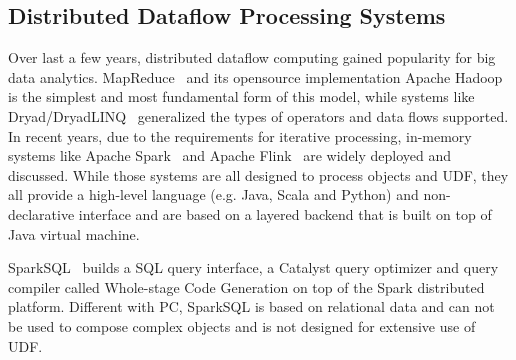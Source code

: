 \subsection{Distributed Dataflow Processing Systems}
Over last a few years, distributed dataflow computing gained
popularity for big
data analytics. MapReduce~\cite {dean2008mapreduce} and its opensource
implementation Apache Hadoop~\cite{white2009hadoop} is the simplest and
most fundamental form of this model, while systems like
Dryad/DryadLINQ~\cite{yu2008dryadlinq} generalized the types of operators and
data flows supported. In recent years, due to the requirements for
iterative processing, in-memory systems like
Apache Spark~\cite{zaharia2012resilient} and
Apache Flink~\cite{alexandrov2014stratosphere} are widely deployed and
discussed. While those systems are all designed to process objects and
UDF, they all provide a high-level language
(e.g. Java, Scala and Python) and non-declarative interface and are
based on a layered backend that is built on top of Java virtual machine.

SparkSQL~\cite{armbrust2015spark} builds a SQL query
interface, a Catalyst query optimizer and query compiler called Whole-stage Code Generation
on top of the Spark distributed platform. Different with PC, SparkSQL
is based on relational data and can not be used to compose complex
objects and is not designed for extensive use of UDF.





